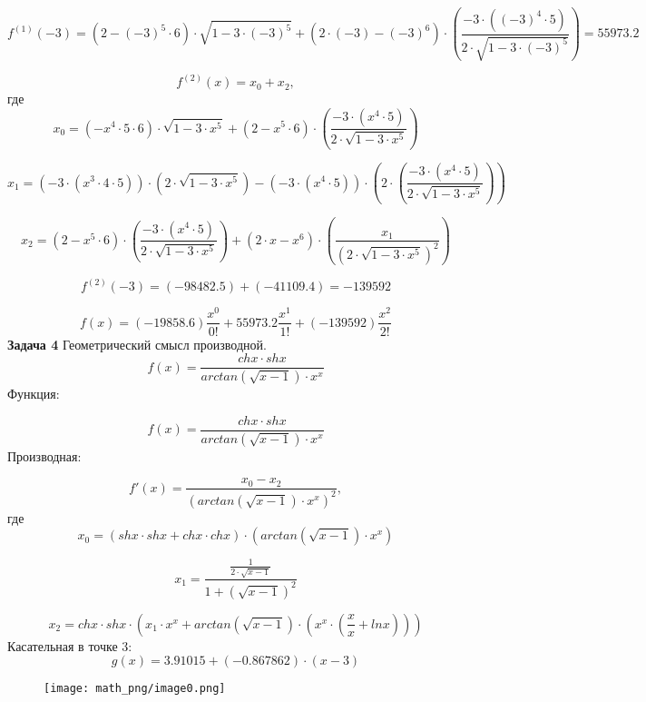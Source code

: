 \documentclass[12pt,a4paper,fleqn]{article}
\begin{document}
$$
f^{(1)}(-3)=\left(2-(-3)^{5}\cdot6\right)\cdot\sqrt{1-3\cdot(-3)^{5}}+\left(2\cdot(-3)-(-3)^{6}\right)\cdot\left(\frac{-3\cdot\left((-3)^{4}\cdot5\right)}{2\cdot\sqrt{1-3\cdot(-3)^{5}}}\right)=55973.2
$$

$$
f^{(2)}(x)= x_{0}+ x_{2},
$$
где
$$
x_{0} = \left(- x^{4}\cdot5\cdot6\right)\cdot\sqrt{1-3\cdot x^{5}}+\left(2- x^{5}\cdot6\right)\cdot\left(\frac{-3\cdot\left( x^{4}\cdot5\right)}{2\cdot\sqrt{1-3\cdot x^{5}}}\right)
$$

$$
x_{1} = \left(-3\cdot\left( x^{3}\cdot4\cdot5\right)\right)\cdot\left(2\cdot\sqrt{1-3\cdot x^{5}}\right)-\left(-3\cdot\left( x^{4}\cdot5\right)\right)\cdot\left(2\cdot\left(\frac{-3\cdot\left( x^{4}\cdot5\right)}{2\cdot\sqrt{1-3\cdot x^{5}}}\right)\right)
$$

$$
x_{2} = \left(2- x^{5}\cdot6\right)\cdot\left(\frac{-3\cdot\left( x^{4}\cdot5\right)}{2\cdot\sqrt{1-3\cdot x^{5}}}\right)+\left(2\cdot x- x^{6}\right)\cdot\left(\frac{ x_{1}}{\left(2\cdot\sqrt{1-3\cdot x^{5}}\right)^{2}}\right)
$$

$$
f^{(2)}(-3)=(-98482.5)+(-41109.4)=-139592
$$

$$
f(x)=(-19858.6)\frac{x^0}{0!}+55973.2\frac{x^1}{1!}+(-139592)\frac{x^2}{2!}
$$
{\bf \Large
Задача 4
}
Геометрический смысл производной.
$$
f(x)=\frac{ ch x\cdot sh x}{ arctan\left(\sqrt{ x-1}\right)\cdot x^{ x}}
$$
Функция:

$$
f(x)=\frac{ ch x\cdot sh x}{ arctan\left(\sqrt{ x-1}\right)\cdot x^{ x}}
$$
Производная:

$$
f'(x)=\frac{ x_{0}- x_{2}}{\left( arctan\left(\sqrt{ x-1}\right)\cdot x^{ x}\right)^{2}},
$$
где
$$
x_{0} = \left( sh x\cdot sh x+ ch x\cdot ch x\right)\cdot\left( arctan\left(\sqrt{ x-1}\right)\cdot x^{ x}\right)
$$

$$
x_{1} = \frac{\frac{1}{2\cdot\sqrt{ x-1}}}{1+\left(\sqrt{ x-1}\right)^{2}}
$$

$$
x_{2} =  ch x\cdot sh x\cdot\left( x_{1}\cdot x^{ x}+ arctan\left(\sqrt{ x-1}\right)\cdot\left( x^{ x}\cdot\left(\frac{ x}{ x}+ ln x\right)\right)\right)
$$
Касательная в точке 3:
$$
g(x)=3.91015+(-0.867862)\cdot\left( x-3\right)
$$
\begin{figure}[h]
\centering
\texttt{[image: math\_png/image0.png]}
\end{figure}
\end{document}
